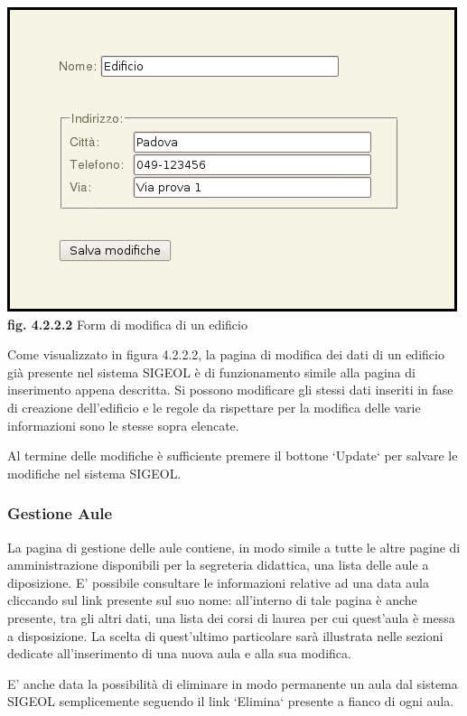 \documentclass[11pt,a4paper]{article}
\begin{document}
\begin{center}
	\includegraphics[scale=0.5]{images/modifica_edificio.jpg}\\
	\textbf{fig. 4.2.2.2} Form di modifica di un edificio\\
\end{center}

Come visualizzato in figura 4.2.2.2, la pagina di modifica dei dati di un edificio già presente nel sistema SIGEOL è di funzionamento simile alla pagina di inserimento appena descritta. Si possono modificare gli stessi dati inseriti in fase di creazione dell'edificio e le regole da rispettare per la modifica delle varie informazioni sono le stesse sopra elencate.

Al termine delle modifiche è sufficiente premere il bottone `Update` per salvare le modifiche nel sistema SIGEOL.
\subsubsection{Gestione Aule}
La pagina di gestione delle aule contiene, in modo simile a tutte le altre pagine di amministrazione disponibili per la segreteria didattica, una lista delle aule a diposizione.
E' possibile consultare le informazioni relative ad una data aula cliccando sul link presente sul suo nome: all'interno di tale pagina è anche presente, tra gli altri dati, una lista dei corsi di laurea per cui quest'aula è messa a disposizione. La scelta di quest'ultimo particolare sarà illustrata nelle sezioni dedicate all'inserimento di una nuova aula e alla sua modifica.

E' anche data la possibilità di eliminare in modo permanente un aula dal sistema SIGEOL semplicemente seguendo il link `Elimina` presente a fianco di ogni aula.
\end{document}
